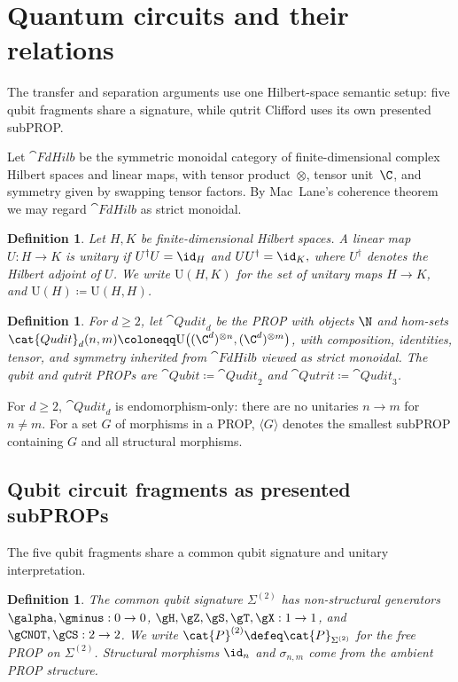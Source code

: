 \documentclass[10pt,a4paper]{article}
\newtheorem{definition}[theorem]{Definition}
\begin{document}
\section{Quantum circuits and their relations}
\label{sec:circuits-relations}

The transfer and separation arguments use one Hilbert-space semantic setup: five qubit fragments
share a signature, while qutrit Clifford uses its own presented subPROP.

Let \(\cat{FdHilb}\) be the symmetric monoidal category of finite-dimensional
complex Hilbert spaces and linear maps, with tensor product~\(\otimes\), tensor
unit~\(\C\), and symmetry given by swapping tensor factors.  By Mac~Lane's
coherence theorem \cite{Saunders} we may regard \(\cat{FdHilb}\) as strict monoidal.

\begin{definition}\label{def:unitary}
Let \(H,K\) be finite-dimensional Hilbert spaces. A linear map \(U:H\to K\) is \emph{unitary} if
\(
  U^\dagger U = \id_H
\) and \(
  UU^\dagger = \id_K,
\)
where \(U^\dagger\) denotes the Hilbert adjoint of \(U\).
We write \(\mathrm{U}(H,K)\) for the set of unitary maps \(H\to K\), and \(\mathrm{U}(H)\coloneqq \mathrm{U}(H,H)\).
\end{definition}

\begin{definition}\label{def:qubit-qutrit-props}
For \(d\ge 2\), let \(\cat{Qudit}_d\) be the PROP with objects \(\N\) and
hom-sets \(\cat{Qudit}_d(n,m)\coloneqq
\mathrm{U}\big((\C^d)^{\otimes n},(\C^d)^{\otimes m}\big)\), with composition,
identities, tensor, and symmetry inherited from \(\cat{FdHilb}\) viewed as
strict monoidal.  The qubit and qutrit PROPs are
\(\cat{Qubit}\coloneqq\cat{Qudit}_2\) and
\(\cat{Qutrit}\coloneqq\cat{Qudit}_3\).
\end{definition}
For \(d\ge2\), \(\cat{Qudit}_d\) is endomorphism-only: there are no unitaries
\(n\to m\) for \(n\neq m\).
For a set \(G\) of morphisms in a PROP, \(\langle G\rangle\) denotes the smallest subPROP
containing \(G\) and all structural morphisms.

\subsection{Qubit circuit fragments as presented subPROPs}

The five qubit fragments share a common qubit signature and unitary interpretation.

\begin{definition}
The \emph{common qubit signature} \(\Sigma^{(2)}\) has non-structural generators
\(\galpha,\gminus:0\to0\),
\(\gH,\gZ,\gS,\gT,\gX:1\to1\), and \(\gCNOT,\gCS:2\to2\).
We write \(\cat{P}^{(2)}\defeq\cat{P}_{\Sigma^{(2)}}\) for the free PROP on
\(\Sigma^{(2)}\).  Structural morphisms \(\id_n\) and \(\sigma_{n,m}\) come from the
ambient PROP structure.
\end{definition}
\end{document}
